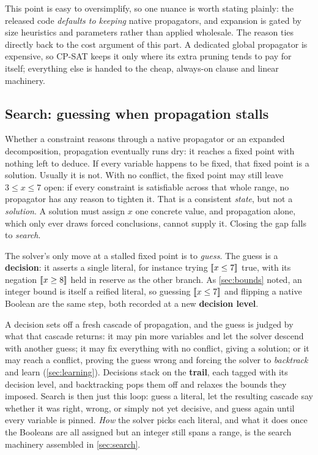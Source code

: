 This point is easy to oversimplify, so one nuance is worth stating plainly: the
released code \emph{defaults to keeping} native propagators, and expansion is
gated by size heuristics and parameters rather than applied wholesale. The
reason ties directly back to the cost argument of this part. A dedicated global
propagator is expensive, so CP-SAT keeps it only where its extra pruning tends
to pay for itself; everything else is handed to the cheap, always-on clause and
linear machinery.
\subsection{Search: guessing when propagation stalls}\label{sec:complete}

Whether a constraint reasons through a native propagator or an expanded
decomposition, propagation eventually runs dry: it reaches a fixed point with
nothing left to deduce. If every variable happens to be fixed, that fixed point
is a solution. Usually it is not. With no conflict, the fixed point may still
leave $3 \le x \le 7$ open: if every constraint is satisfiable across that whole
range, no propagator has any reason to tighten it. That is a consistent
\emph{state}, but not a \emph{solution}. A solution must assign $x$ one concrete
value, and propagation alone, which only ever draws forced conclusions, cannot
supply it. Closing the gap falls to \emph{search}.

The solver's only move at a stalled fixed point is to \emph{guess}. The guess is
a \textbf{decision}: it asserts a single literal, for instance trying
$[\![x \le 7]\!]$ true, with its negation $[\![x \ge 8]\!]$ held in reserve as the other branch. As \cref{sec:bounds}
noted, an integer bound is itself a reified literal, so guessing
$[\![x \le 7]\!]$ and flipping a native Boolean are the same step,
both recorded at a new \textbf{decision level}.

A decision sets off a fresh cascade of propagation, and the guess is judged by
what that cascade returns: it may pin more variables and let the solver descend
with another guess; it may fix everything with no conflict, giving a solution; or
it may reach a conflict, proving the guess wrong and forcing the solver to
\emph{backtrack} and learn (\cref{sec:learning}). Decisions stack on the
\textbf{trail}, each tagged with its decision level, and backtracking pops them
off and relaxes the bounds they imposed. Search is then just this loop: guess a
literal, let the resulting cascade say whether it was right, wrong, or simply not
yet decisive, and guess again until every variable is pinned. \emph{How} the
solver picks each literal, and what it does once the Booleans are all assigned
but an integer still spans a range, is the search machinery assembled in
\cref{sec:search}.

